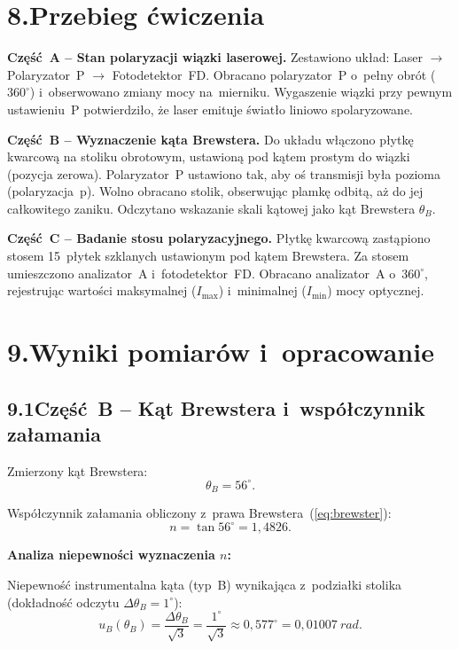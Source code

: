 \documentclass[a4paper,12pt]{article}
\begin{document}
\section*{8.\quad Przebieg ćwiczenia}

\textbf{Część~A -- Stan polaryzacji wiązki laserowej.}
Zestawiono układ: Laser $\to$ Polaryzator~P $\to$ Fotodetektor~FD.
Obracano polaryzator~P o~pełny obrót (\(360^\circ\)) i~obserwowano zmiany mocy
na~mierniku. Wygaszenie wiązki przy pewnym ustawieniu~P potwierdziło, że
laser emituje światło liniowo spolaryzowane.

\medskip
\textbf{Część~B -- Wyznaczenie kąta Brewstera.}
Do układu włączono płytkę kwarcową na stoliku obrotowym, ustawioną pod kątem
prostym do wiązki (pozycja zerowa). Polaryzator~P ustawiono tak, aby oś
transmisji była pozioma (polaryzacja~p). Wolno obracano stolik, obserwując
plamkę odbitą, aż do jej całkowitego zaniku. Odczytano wskazanie skali
kątowej jako kąt Brewstera $\theta_B$.

\medskip
\textbf{Część~C -- Badanie stosu polaryzacyjnego.}
Płytkę kwarcową zastąpiono stosem 15~płytek szklanych ustawionym pod
kątem Brewstera. Za stosem umieszczono analizator~A i~fotodetektor~FD.
Obracano analizator~A o~\(360^\circ\), rejestrując wartości maksymalnej
($I_{\max}$) i~minimalnej ($I_{\min}$) mocy optycznej.

\section*{9.\quad Wyniki pomiarów i~opracowanie}

\subsection*{9.1\quad Część~B -- Kąt Brewstera i~współczynnik załamania}

Zmierzony kąt Brewstera:
\[
  \theta_B = 56^\circ.
\]

Współczynnik załamania obliczony z~prawa Brewstera~(\ref{eq:brewster}):
\[
  n = \tan 56^\circ = 1{,}4826.
\]

\noindent\textbf{Analiza niepewności wyznaczenia $n$:}

Niepewność instrumentalna kąta (typ~B) wynikająca z~podziałki stolika
(dokładność odczytu $\Delta\theta_B = 1^\circ$):
\[
  u_B(\theta_B) = \frac{\Delta\theta_B}{\sqrt{3}}
  = \frac{1^\circ}{\sqrt{3}}
  \approx 0{,}577^\circ
  = 0{,}01007\ \si{rad}.
\]
\end{document}
